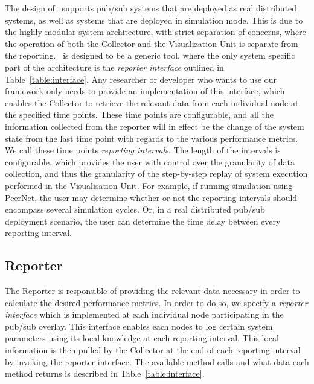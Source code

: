 The design of \demo~supports pub/sub systems that are deployed as
real distributed systems, as well as systems that are deployed in
simulation mode. This is due to the highly modular system architecture,
with strict separation of concerns, where the operation of both the
Collector and the Visualization Unit is separate from the reporting.
\demo~is designed to be a generic tool, where the only system specific
part of the architecture is the \emph{reporter interface} outlined in
Table~\ref{table:interface}. Any researcher or developer
who wants to use our framework only needs to provide an implementation
of this interface, which enables the Collector to retrieve the relevant
data from each individual node at the specified time points. These time
points are configurable, and all the information collected from the
reporter will in effect be the change of the system state from the last
time point with regards to the various performance metrics. We call
these time points \emph{reporting intervals}. The length of the intervals
is configurable, which provides the user with control over the
granularity of data collection, and thus the granularity of the
step-by-step replay of system execution performed in the Visualisation Unit. For example, if
running simulation using PeerNet, the user may determine whether or not
the reporting intervals should encompass several simulation cycles. Or,
in a real distributed pub/sub deployment scenario, the user can
determine the time delay between every reporting interval.


\subsection{Reporter}

The Reporter is responsible of providing the relevant data necessary in
order to calculate the desired performance metrics. In order to do so,
we specify a \emph{reporter interface} which is implemented at each
individual node participating in the pub/sub overlay. This interface
enables each nodes to log certain system parameters using its local
knowledge at each reporting interval. This local information is then pulled
by the Collector at the end of each reporting interval by invoking the
reporter interface. The available method calls and what data each method
returns is described in Table~\ref{table:interface}.



